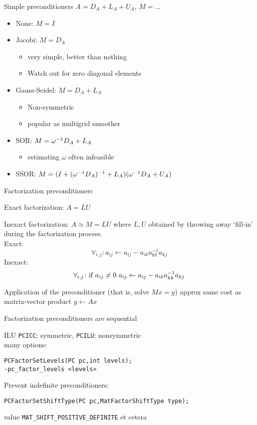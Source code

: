 \begin{longversion}
\begin{numberedframe}{Simple preconditioners}
  $A = D_A+L_A+U_A$, $M=\ldots$
  \begin{itemize}
  \item None: $M=I$
  \item Jacobi: $M=D_A$
    \begin{itemize}
    \item very simple, better than nothing
    \item Watch out for zero diagonal elements
    \end{itemize}
  \item Gauss-Seidel: $M=D_A+L_A$
    \begin{itemize}
    \item Non-symmetric
    \item popular as multigrid smoother
    \end{itemize}
  \item SOR: $M=\omega^{-1} D_A+L_A$
    \begin{itemize}
    \item estimating $\omega$ often infeasible
    \end{itemize}
  \item SSOR: $M=(I+(\omega^{-1} D_A)^{-1}+L_A)(\omega^{-1} D_A+U_A)$
  \end{itemize}
\end{numberedframe}

\begin{numberedframe}{Factorization preconditioners}

Exact factorization: $A=LU$

Inexact factorization: $A\approx M=LU$ where $L,U$
obtained by throwing away `fill-in' during the factorization process.\\
Exact:
\[ \forall_{i,j}\colon a_{ij}\leftarrow a_{ij}-a_{ik}a_{kk}^{-1}a_{kj} \]
Inexact:
\[ \forall_{i,j}\colon \hbox{if $a_{ij}\not=0$ }
   a_{ij}\leftarrow a_{ij}-a_{ik}a_{kk}^{-1}a_{kj} \]

Application of the preconditioner (that is, solve $Mx=y$)
approx same cost as matrix-vector product $y\leftarrow Ax$

Factorization preconditioners are sequential
\end{numberedframe}

\begin{numberedframe}{ILU}
\lstinline{PCICC}: symmetric, \lstinline{PCILU}: nonsymmetric\\
many options:
\begin{lstlisting}
PCFactorSetLevels(PC pc,int levels);
-pc_factor_levels <levels>
\end{lstlisting}

Prevent indefinite preconditioners:
\begin{lstlisting}
PCFactorSetShiftType(PC pc,MatFactorShiftType type);
\end{lstlisting}
value \lstinline{MAT_SHIFT_POSITIVE_DEFINITE} et cetera
\end{numberedframe}

\end{longversion}


